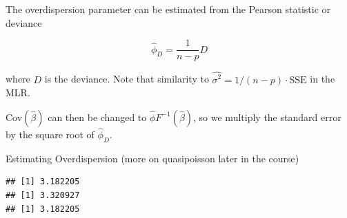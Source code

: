 \documentclass[
  ignorenonframetext,
]{beamer}
\newenvironment{Shaded}{\begin{snugshade}}{\end{snugshade}}
\newcommand{\AttributeTok}[1]{\textcolor[rgb]{0.13,0.29,0.53}{#1}}
\newcommand{\CommentTok}[1]{\textcolor[rgb]{0.56,0.35,0.01}{\textit{#1}}}
\newcommand{\DecValTok}[1]{\textcolor[rgb]{0.00,0.00,0.81}{#1}}
\newcommand{\FunctionTok}[1]{\textcolor[rgb]{0.13,0.29,0.53}{\textbf{#1}}}
\newcommand{\NormalTok}[1]{#1}
\newcommand{\OtherTok}[1]{\textcolor[rgb]{0.56,0.35,0.01}{#1}}
\newcommand{\SpecialCharTok}[1]{\textcolor[rgb]{0.81,0.36,0.00}{\textbf{#1}}}
\begin{document}
\begin{frame}
The overdispersion parameter can be estimated from the Pearson statistic
or deviance

\[\hat{\phi}_D = \frac{1}{n-p} D\]

where \(D\) is the deviance. Note that similarity to
\(\hat{\sigma^2} = 1/(n-p)\cdot\text{SSE}\) in the MLR.

Cov\((\hat{\beta})\) can then be changed to
\(\hat{\phi}F^{-1}(\hat{\beta})\), so we multiply the standard error by
the square root of \(\hat{\phi}_D\).
\end{frame}

\begin{frame}[fragile]{Estimating Overdispersion}
\protect\hypertarget{estimating-overdispersion}{}
(more on quasipoisson later in the course)

\begin{Shaded}
\end{Shaded}

\begin{verbatim}
## [1] 3.182205
## [1] 3.320927
## [1] 3.182205
\end{verbatim}
\end{frame}
\end{document}
